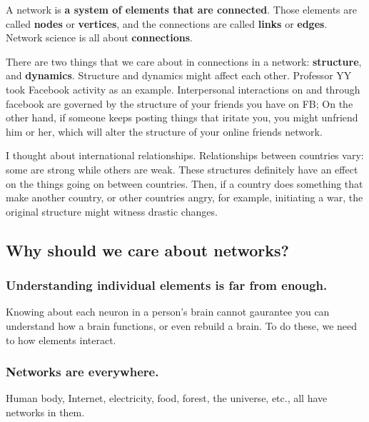 \documentclass[
]{krantz}
\begin{document}
A network is \textbf{a system of elements that are connected}. Those elements are called \textbf{nodes} or \textbf{vertices}, and the connections are called \textbf{links} or \textbf{edges}. Network science is all about \textbf{connections}.

There are two things that we care about in connections in a network: \textbf{structure}, and \textbf{dynamics}. Structure and dynamics might affect each other. Professor YY took Facebook activity as an example. Interpersonal interactions on and through facebook are governed by the structure of your friends you have on FB; On the other hand, if someone keeps posting things that iritate you, you might unfriend him or her, which will alter the structure of your online friends network.

I thought about international relationships. Relationships between countries vary: some are strong while others are weak. These structures definitely have an effect on the things going on between countries. Then, if a country does something that make another country, or other countries angry, for example, initiating a war, the original structure might witness drastic changes.

\hypertarget{why-should-we-care-about-networks}{%
\subsection{Why should we care about networks?}\label{why-should-we-care-about-networks}}

\hypertarget{understanding-individual-elements-is-far-from-enough.}{%
\subsubsection{Understanding individual elements is far from enough.}\label{understanding-individual-elements-is-far-from-enough.}}

Knowing about each neuron in a person's brain cannot gaurantee you can understand how a brain functions, or even rebuild a brain. To do these, we need to how elements interact.

\hypertarget{networks-are-everywhere.}{%
\subsubsection{Networks are everywhere.}\label{networks-are-everywhere.}}

Human body, Internet, electricity, food, forest, the universe, etc., all have networks in them.
\end{document}
